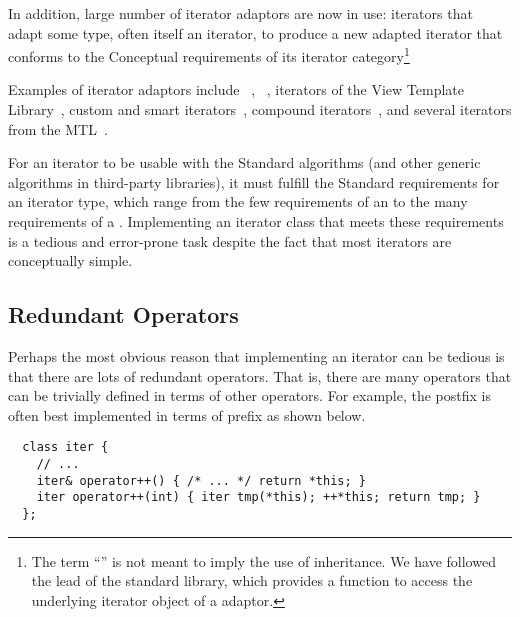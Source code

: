 \documentclass{netobjectdays}
\begin{document}

In addition, large number of iterator adaptors are now in use:
iterators that adapt some  type, often itself an iterator,
to produce a new adapted iterator that conforms to the Conceptual
requirements of its iterator category\footnote{The term
``'' is not meant to imply the use of inheritance. We have
followed the lead of the standard library, which provides a
 function to access the underlying iterator object of a
 adaptor.}

%
%
Examples of iterator adaptors include
~\cite{iso98:_cpp_final_draft_standard},
~\cite{stroustrup00:_cpp_prog_lang}, iterators of
the View Template Library~\cite{TMPW00:Weiser}, custom and smart
iterators~\cite{becker98:_smart_iteraters,TMPW00:Baus}, compound
iterators~\cite{alexandrescu98:_compound_iters}, and several iterators
from the MTL~\cite{siek99:_scitools}.

For an iterator to be usable with the Standard algorithms (and other
generic algorithms in third-party libraries), it must fulfill the
Standard requirements for an iterator type, which range from the few
requirements of an  to the many requirements
of a . Implementing an iterator class
that meets these requirements is a tedious and error-prone task
despite the fact that most iterators are conceptually simple.

\subsection{Redundant Operators}

Perhaps the most obvious reason that implementing an iterator can
be tedious is that there are lots of redundant operators.  That is,
there are many operators that can be trivially defined in terms of
other operators. For example, the postfix  is often best
implemented in terms of prefix  as shown below.

{\footnotesize
\begin{verbatim}
  class iter {
    // ...
    iter& operator++() { /* ... */ return *this; }
    iter operator++(int) { iter tmp(*this); ++*this; return tmp; }
  };
\end{verbatim}
}
\end{document}
